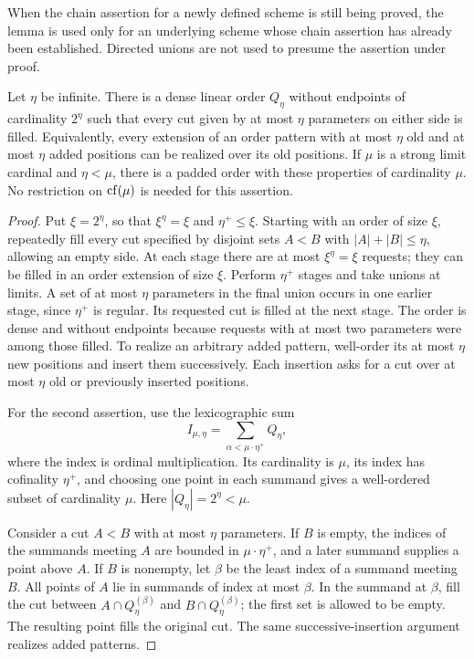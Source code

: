 When the chain assertion for a newly defined scheme is still being
proved, the lemma is used only for an underlying scheme whose chain
assertion has already been established.  Directed unions are not used
to presume the assertion under proof.

\begin{lemma}
\label{lev:rich-orders}
Let $\eta$ be infinite.  There is a dense linear order $Q_\eta$ without
endpoints of cardinality $2^\eta$ such that every cut given by at most
$\eta$ parameters on either side is filled.  Equivalently, every
extension of an order pattern with at most $\eta$ old and at most
$\eta$ added positions can be realized over its old positions.
If $\mu$ is a strong limit cardinal and $\eta<\mu$, there is a padded
order with these properties of cardinality $\mu$.  No restriction on
$\operatorname{cf}(\mu)$ is needed for this assertion.
\end{lemma}

\begin{proof}
Put $\xi=2^\eta$, so that $\xi^\eta=\xi$ and $\eta^+\leq\xi$.
Starting with an order of size $\xi$, repeatedly fill every cut
specified by disjoint sets $A<B$ with $|A|+|B|\leq\eta$, allowing an
empty side.  At each stage there are at most $\xi^\eta=\xi$ requests;
they can be filled in an order extension of size $\xi$.  Perform
$\eta^+$ stages and take unions at limits.  A set of at most $\eta$
parameters in the final union occurs in one earlier stage, since
$\eta^+$ is regular.  Its requested cut is filled at the next stage.
The order is dense and without endpoints because requests with at
most two parameters were among those filled.  To realize an arbitrary
added pattern, well-order its at most $\eta$ new positions and insert
them successively.  Each insertion asks for a cut over at most
$\eta$ old or previously inserted positions.

For the second assertion, use the lexicographic sum
\[
                I_{\mu,\eta}
                =\sum_{\alpha<\mu\cdot\eta^+}Q_\eta,
\]
where the index is ordinal multiplication.  Its cardinality is
$\mu$, its index has cofinality $\eta^+$, and choosing one point in
each summand gives a well-ordered subset of cardinality $\mu$.
Here $|Q_\eta|=2^\eta<\mu$.

Consider a cut $A<B$ with at most $\eta$ parameters.  If $B$ is empty,
the indices of the summands meeting $A$ are bounded in
$\mu\cdot\eta^+$, and a later summand supplies a point above $A$.
If $B$ is nonempty, let $\beta$ be the least index of a summand
meeting $B$.  All points of $A$ lie in summands of index at most
$\beta$.  In the summand at $\beta$, fill the cut between
$A\cap Q_\eta^{(\beta)}$ and $B\cap Q_\eta^{(\beta)}$; the first
set is allowed to be empty.  The resulting point fills the original
cut.  The same successive-insertion argument realizes added patterns.
\end{proof}

